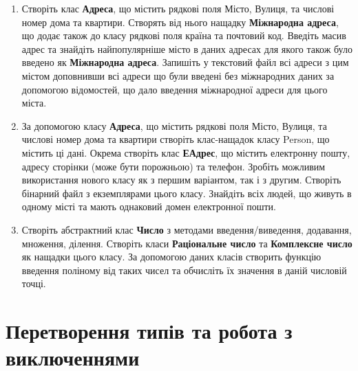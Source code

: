 \documentclass[a5paper,titlepage,openany,twoside,
]
{book_unv}%
\begin{document}
\begin{enumerate}
\item
Створіть клас \textbf{Адреса}, що містить рядкові поля Місто, Вулиця, та числові номер дома та квартири. 
Створять від нього нащадку \textbf{Міжнародна адреса}, що додає також до класу рядкові поля країна та почтовий код.
Введіть масив адрес та знайдіть найпопулярніше місто в даних адресах для якого також було введено як \textbf{Міжнародна адреса}. 
Запишіть у текстовий файл всі адреси з цим містом доповнивши всі адреси що були введені без міжнародних даних
за допомогою відомостей, що дало введення міжнародної адреси для цього міста.

\item
За допомогою класу \textbf{Адреса}, що містить рядкові поля Місто, Вулиця, та числові номер дома та квартири
створіть клас-нащадок класу Person, що містить ці дані. Окрема створіть клас \textbf{ЕАдрес}, що містить
електронну пошту, адресу сторінки (може бути порожньою) та телефон. 
Зробіть можливим використання нового класу як з першим варіантом,
так і з другим. Створіть бінарний файл з екземплярами цього класу. Знайдіть всіх людей, що 
живуть в одному місті та мають однаковий домен електронної пошти. 


\item
Створіть абстрактний клас \textbf{Число} з методами введення/виведення, додавання, множення, ділення.
Створіть класи \textbf{Раціональне число} та \textbf{Комплексне число} як нащадки цього класу. 
За допомогою даних класів створить функцію введення поліному від таких чисел
та обчисліть їх значення в даній числовій точці.


\end{enumerate}


\chapter{Перетворення типів та робота з виключеннями}
%
\end{document}
